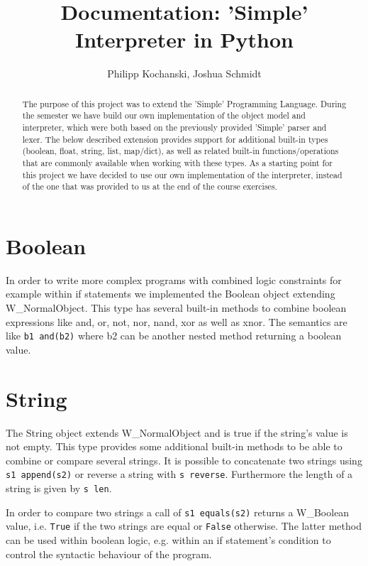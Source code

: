 \documentclass{article}
\begin{document}
\title{Documentation: 'Simple' Interpreter in Python}
\author{Philipp Kochanski, Joshua Schmidt}

\maketitle

\begin{abstract}
The purpose of this project was to extend the 'Simple' Programming Language.
During the semester we have build our own implementation of the object model and interpreter, which were both based
on the previously provided 'Simple' parser and lexer. The below described extension provides support for additional built-in types (boolean, float, string, list, map/dict), as well as related built-in functions/operations that are commonly available when working with these types. As a starting point for this project we have decided to use our own implementation of the interpreter, instead of the one that was provided to us at the end of the course exercises. 
\end{abstract}

\section{Boolean}
In order to write more complex programs with combined logic constraints for example within if statements we implemented the Boolean object extending W\_NormalObject.
This type has several built-in methods to combine boolean expressions like and, or, not, nor, nand, xor as well as xnor.
The semantics are like \texttt{b1 and(b2)} where b2 can be another nested method returning a boolean value.


\section{String}
The String object extends W\_NormalObject and is true if the string's value is not empty.
This type provides some additional built-in methods to be able to combine or compare several strings. 
It is possible to concatenate two strings using \texttt{s1 append(s2)} or reverse a string with \texttt{s reverse}. Furthermore the length of a string is given by \texttt{s len}. 

In order to compare two strings a call of \texttt{s1 equals(s2)} returns a W\_Boolean value, i.e. \texttt{True} if the two strings are equal or \texttt{False} otherwise.
The latter method can be used within boolean logic, e.g. within an if statement's condition to control the syntactic behaviour of the program.
\end{document}
